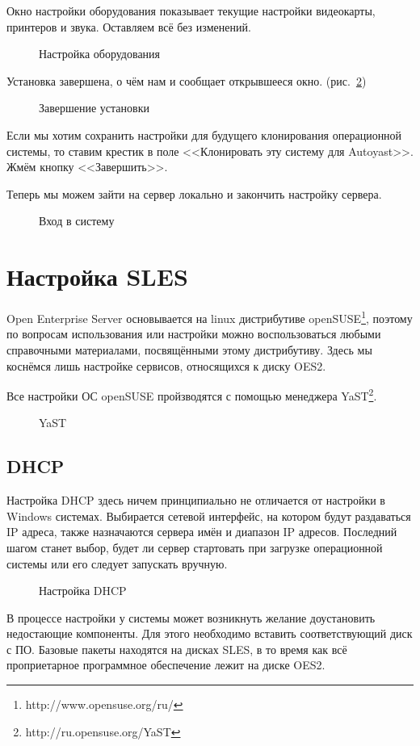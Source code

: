 Окно настройки оборудования показывает текущие настройки видеокарты, принтеров и звука. Оставляем всё без изменений.
\begin{figure}[H]
\caption{Настройка оборудования}
\label{fig14}
\end{figure}
\clearpage

Установка завершена, о чём нам и сообщает открывшееся окно. (рис.~\ref{fig15})
\begin{figure}[H]
\caption{Завершение установки}
\label{fig15}
\end{figure}
Если мы хотим сохранить настройки для будущего клонирования операционной
системы, то ставим крестик в поле <<Клонировать эту систему для Autoyast>>. Жмём кнопку <<Завершить>>.
\clearpage

Теперь мы можем зайти на сервер локально и закончить настройку сервера.
\begin{figure}[H]
\caption{Вход в систему}
\label{fig16}
\end{figure}
\clearpage

\section{Настройка SLES}
Open Enterprise Server основывается на linux дистрибутиве openSUSE\footnote{http://www.opensuse.org/ru/}, поэтому по вопросам использования или настройки можно воспользоваться любыми справочными материалами, посвящёнными этому дистрибутиву. Здесь мы коснёмся лишь настройке сервисов, относящихся к диску OES2.\par 
Все настройки ОС openSUSE пройзводятся с помощью менеджера YaST\footnote{http://ru.opensuse.org/YaST}.
\begin{figure}[H]
\caption{YaST}
\label{yast}
\end{figure}
\clearpage

\subsection{DHCP}
Настройка DHCP здесь ничем принципиально не отличается от настройки в Windows системах. Выбирается сетевой интерфейс, на котором будут раздаваться IP адреса, также назначаются сервера имён и диапазон IP адресов. Последний шагом станет выбор, будет ли сервер стартовать при загрузке операционной системы или его следует запускать вручную.
\begin{figure}[H]
\caption{Настройка DHCP}
\label{dhcp}
\end{figure}
В процессе настройки у системы может возникнуть желание доустановить недостающие компоненты. Для этого необходимо вставить соответствующий диск с ПО. Базовые пакеты находятся на дисках SLES, в то время как всё проприетарное программное обеспечение лежит на диске OES2.
\clearpage

